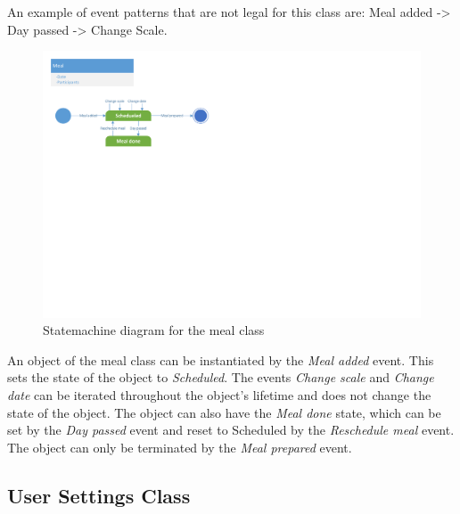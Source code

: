 An example of event patterns that are not legal for this class are: Meal added -> Day passed -> Change Scale.

\begin{figure}[H]
	\centering
	\includegraphics[clip=true, trim=0.5cm 13cm 16.5cm 0.5cm]{Development/ProblemDomain/MealClass.pdf}
	\caption{Statemachine diagram for the meal class} \label{MealClass}
\end{figure}

An object of the meal class can be instantiated by the \textit{Meal added} event. This sets the state of the object to \textit{Scheduled}. The events \textit{Change scale} and \textit{Change date} can be iterated throughout the object's lifetime and does not change the state of the object. The object can also have the \textit{Meal done} state, which can be set by the \textit{Day passed} event and reset to Scheduled by the \textit{Reschedule meal} event. The object can only be terminated by the \textit{Meal prepared} event.

\subsection{User Settings Class}


